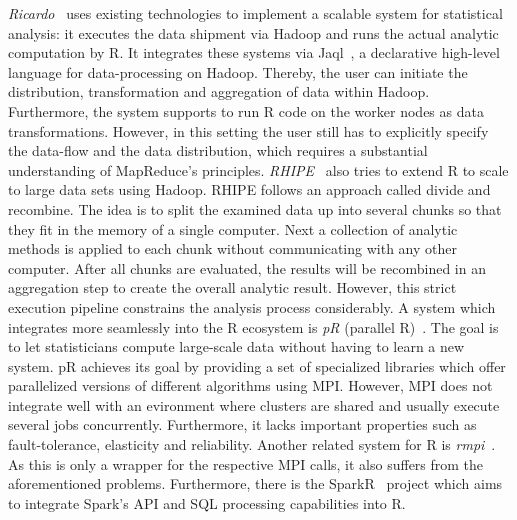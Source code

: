 {\em Ricardo}~\cite{das:2010a} uses existing technologies to implement a scalable system for statistical analysis: it executes the data shipment via Hadoop and runs the actual analytic computation by R. 
It integrates these systems via Jaql~\cite{beyer:2011a}, a declarative high-level language for data-processing on Hadoop. 
Thereby, the user can initiate the distribution, transformation and aggregation of data within Hadoop. 
Furthermore, the system supports to run R code on the worker nodes as data transformations. 
However, in this setting the user still has to explicitly specify the data-flow and the data distribution, which requires a substantial understanding of MapReduce's principles. 
{\em RHIPE}~\cite{guha:s2012a} also tries to extend R to scale to large data sets using Hadoop. 
RHIPE follows an approach called divide and recombine. 
The idea is to split the examined data up into several chunks so that they fit in the memory of a single computer. 
Next a collection of analytic methods is applied to each chunk without communicating with any other computer. 
After all chunks are evaluated, the results will be recombined in an aggregation step to create the overall analytic result. 
However, this strict execution pipeline constrains the analysis process considerably. 
A system which integrates more seamlessly into the R ecosystem is {\em pR} (parallel R)~\cite{samatova:2009a}. 
The goal is to let statisticians compute large-scale data without having to learn a new system. 
pR achieves its goal by providing a set of specialized libraries which offer parallelized versions of different algorithms using MPI.
However, MPI does not integrate well with an evironment where clusters are shared and usually execute several jobs concurrently. 
Furthermore, it lacks important properties such as fault-tolerance, elasticity and reliability. 
Another related system for R is {\em rmpi}~\cite{rmpi}. 
As this is only a wrapper for the respective MPI calls, it also suffers from the aforementioned problems. 
Furthermore, there is the SparkR~\cite{Venkataraman2016} project which aims to integrate Spark's API and SQL processing capabilities into R. 

